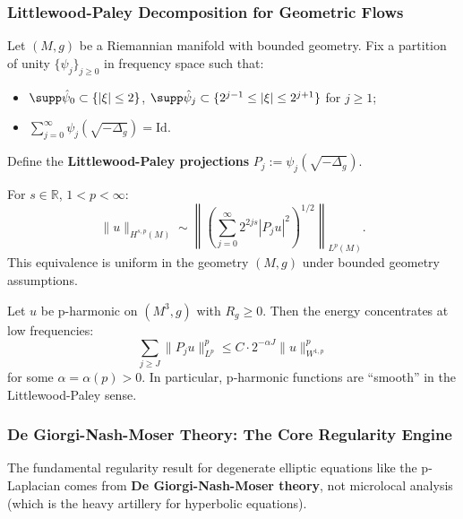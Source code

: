 \subsubsection{Littlewood-Paley Decomposition for Geometric Flows}

\begin{definition}\label{def:LP-manifold}
Let $(M, g)$ be a Riemannian manifold with bounded geometry. Fix a partition of unity $\{\psi_j\}_{j \geq 0}$ in frequency space such that:
\begin{itemize}
\item $\supp \hat{\psi}_0 \subset \{|\xi| \leq 2\}$, $\supp \hat{\psi}_j \subset \{2^{j-1} \leq |\xi| \leq 2^{j+1}\}$ for $j \geq 1$;
\item $\sum_{j=0}^\infty \psi_j(\sqrt{-\Delta_g}) = \mathrm{Id}$.
\end{itemize}
Define the \textbf{Littlewood-Paley projections} $P_j := \psi_j(\sqrt{-\Delta_g})$.
\end{definition}

\begin{theorem}\label{thm:LP-sobolev}
For $s \in \mathbb{R}$, $1 < p < \infty$:
\begin{equation}
\|u\|_{H^{s,p}(M)} \sim \left\| \left( \sum_{j=0}^\infty 2^{2js} |P_j u|^2 \right)^{1/2} \right\|_{L^p(M)}.
\end{equation}
This equivalence is uniform in the geometry $(M, g)$ under bounded geometry assumptions.
\end{theorem}

\begin{proposition}\label{prop:p-harmonic-LP}
Let $u$ be p-harmonic on $(M^3, g)$ with $R_g \geq 0$. Then the energy concentrates at low frequencies:
\begin{equation}
\sum_{j \geq J} \|P_j u\|_{L^p}^p \leq C \cdot 2^{-\alpha J} \|u\|_{W^{1,p}}^p
\end{equation}
for some $\alpha = \alpha(p) > 0$. In particular, p-harmonic functions are ``smooth'' in the Littlewood-Paley sense.
\end{proposition}

\subsubsection{De Giorgi-Nash-Moser Theory: The Core Regularity Engine}

The fundamental regularity result for degenerate elliptic equations like the p-Laplacian comes from \textbf{De Giorgi-Nash-Moser theory}, not microlocal analysis (which is the heavy artillery for hyperbolic equations).

